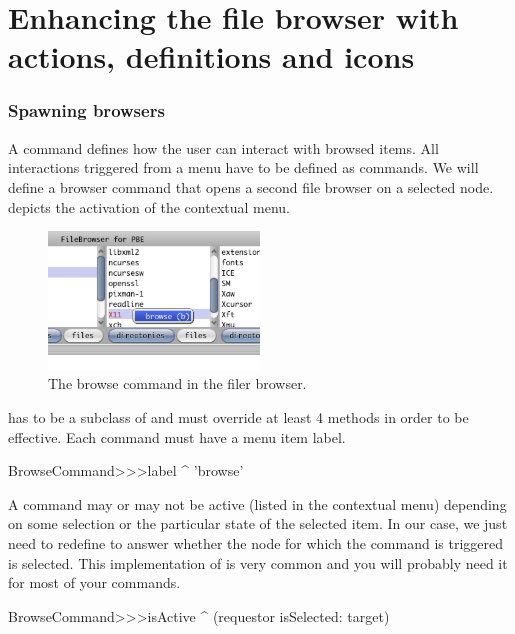 \documentclass[a4paper,10pt,twoside]{book}
\begin{document}

\section{Enhancing the file browser with actions, definitions and icons} 

\subsubsection{Spawning browsers}

A command defines how the user can interact with browsed items. All interactions triggered from a menu have to be defined as commands. We will define a browser command that opens a second file browser on a selected node.  depicts the activation of the contextual menu.


\begin{figure}[!ht]
\begin{center}
\includegraphics[width=0.5\textwidth]{command}
\caption{The browse command in the filer browser.} 
\end{center}
\end{figure}


 has to be a subclass of  and must override at least 4 methods in order to be effective. Each command must have a menu item label.
\begin{code}{}    
BrowseCommand>>>label
	^ 'browse'
\end{code}

A command may or may not be active (\ie listed in the contextual menu) depending on some selection or the particular state of the selected item. In our case, we just need to redefine  to answer whether the node for which the command is triggered is selected. This implementation of  is very common and you will probably need it for most of your commands.
\begin{code}{}    
BrowseCommand>>>isActive
	^ (requestor isSelected: target)
\end{code}
\end{document}
